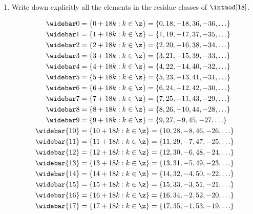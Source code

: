 \begin{enumerate}
    \item Write down explicitly all the elements in the residue classes of $\intmod[18]$.
    \begin{sol}
        \begin{align*}
            \widebar 0 & = \{0 + 18k : k \in \z\} = \{0, 18, -18, 36, -36, \ldots\} \\
            \widebar 1 & = \{1 + 18k : k \in \z\} = \{1, 19, -17, 37, -35, \ldots\} \\
            \widebar 2 & = \{2 + 18k : k \in \z\} = \{2, 20, -16, 38, -34, \ldots\} \\
            \widebar 3 & = \{3 + 18k : k \in \z\} = \{3, 21, -15, 39, -33, \ldots\} \\
            \widebar 4 & = \{4 + 18k : k \in \z\} = \{4, 22, -14, 40, -32, \ldots\} \\
            \widebar 5 & = \{5 + 18k : k \in \z\} = \{5, 23, -13, 41, -31, \ldots\} \\
            \widebar 6 & = \{6 + 18k : k \in \z\} = \{6, 24, -12, 42, -30, \ldots\} \\
            \widebar 7 & = \{7 + 18k : k \in \z\} = \{7, 25, -11, 43, -29, \ldots\} \\
            \widebar 8 & = \{8 + 18k : k \in \z\} = \{8, 26, -10, 44, -28, \ldots\} \\
            \widebar 9 & = \{9 + 18k : k \in \z\} =\{9, 27, -9, 45, -27, \ldots\} \\
            \widebar{10} & = \{10 + 18k : k \in \z\} = \{10, 28, -8, 46, -26, \ldots\} \\
            \widebar{11} & = \{11 + 18k : k \in \z\} = \{11, 29, -7, 47, -25, \ldots\} \\
            \widebar{12} & = \{12 + 18k : k \in \z\} = \{12, 30, -6, 48, -24, \ldots\} \\
            \widebar{13} & = \{13 + 18k : k \in \z\} = \{13, 31, -5, 49, -23, \ldots\} \\
            \widebar{14} & = \{14 + 18k : k \in \z\} = \{14, 32, -4, 50, -22, \ldots\} \\
            \widebar{15} & = \{15 + 18k : k \in \z\} = \{15, 33, -3, 51, -21, \ldots\} \\
            \widebar{16} & = \{16 + 18k : k \in \z\} = \{16, 34, -2, 52, -20, \ldots\} \\
            \widebar{17} & = \{17 + 18k : k \in \z\} = 
            \{17, 35, -1, 53, -19, \ldots\}
        \end{align*}

\end{sol}
\end{enumerate}
